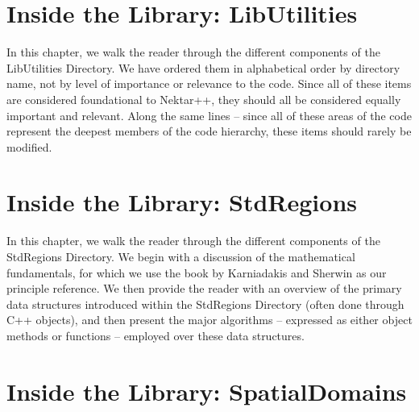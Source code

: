 
\chapter{Inside the Library: LibUtilities}

In this chapter, we walk the reader through the different components of the LibUtilities Directory.
We have ordered them in alphabetical order by directory name, not by level of importance or
relevance to the code.  Since all of these items are considered foundational to Nektar++, they
should all be considered equally important and relevant.   Along the same lines -- since all of
these areas of the code represent the deepest members of the code hierarchy, these
items should rarely be modified. 
%

%

%

%

%

%

%

%

%

%

%


\chapter{Inside the Library: StdRegions}
\label{chap:stdregions}

In this chapter, we walk the reader through the different components of the StdRegions Directory.
We begin with a discussion of the mathematical fundamentals, for which we use the book
by Karniadakis and Sherwin \cite{KaSh05} as our principle reference.  We then provide
the reader with an overview of the primary data structures introduced within the
StdRegions Directory (often done through C++ objects), and then present the major 
algorithms -- expressed as either object methods or functions -- employed over these data structures.  


%

%



\chapter{Inside the Library: SpatialDomains}
\label{chap:spatialdomains}


